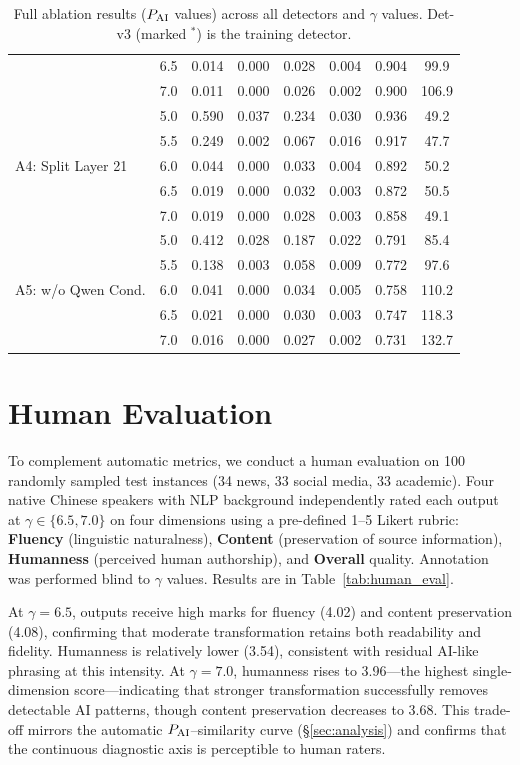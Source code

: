 \begin{table}[t]
\begin{tabular}{l c cccc cc}
& 6.5 & 0.014 & 0.000 & 0.028 & 0.004 & 0.904 & 99.9 \\
& 7.0 & 0.011 & 0.000 & 0.026 & 0.002 & 0.900 & 106.9 \\
\midrule
\multirow{5}{*}{A4: Split Layer 21}
& 5.0 & 0.590 & 0.037 & 0.234 & 0.030 & 0.936 & 49.2 \\
& 5.5 & 0.249 & 0.002 & 0.067 & 0.016 & 0.917 & 47.7 \\
& 6.0 & 0.044 & 0.000 & 0.033 & 0.004 & 0.892 & 50.2 \\
& 6.5 & 0.019 & 0.000 & 0.032 & 0.003 & 0.872 & 50.5 \\
& 7.0 & 0.019 & 0.000 & 0.028 & 0.003 & 0.858 & 49.1 \\
\midrule
\multirow{5}{*}{A5: w/o Qwen Cond.}
& 5.0 & 0.412 & 0.028 & 0.187 & 0.022 & 0.791 & 85.4 \\
& 5.5 & 0.138 & 0.003 & 0.058 & 0.009 & 0.772 & 97.6 \\
& 6.0 & 0.041 & 0.000 & 0.034 & 0.005 & 0.758 & 110.2 \\
& 6.5 & 0.021 & 0.000 & 0.030 & 0.003 & 0.747 & 118.3 \\
& 7.0 & 0.016 & 0.000 & 0.027 & 0.002 & 0.731 & 132.7 \\
\bottomrule
\end{tabular}
\caption{Full ablation results ($P_{\text{AI}}$ values) across all detectors and $\gamma$ values. Det-v3 (marked $^*$) is the training detector.}
\label{tab:ablation_full}
\end{table}

\section{Human Evaluation}
\label{sec:app_human_eval}

To complement automatic metrics, we conduct a human evaluation on 100 randomly sampled test instances (34 news, 33 social media, 33 academic).
Four native Chinese speakers with NLP background independently rated each \styleshield{} output at $\gamma\!\in\!\{6.5, 7.0\}$ on four dimensions using a pre-defined 1--5 Likert rubric:
\textbf{Fluency} (linguistic naturalness),
\textbf{Content} (preservation of source information),
\textbf{Humanness} (perceived human authorship), and
\textbf{Overall} quality.
Annotation was performed blind to $\gamma$ values.
Results are in Table~\ref{tab:human_eval}.

At $\gamma{=}6.5$, outputs receive high marks for fluency (4.02) and content preservation (4.08), confirming that moderate transformation retains both readability and fidelity.
Humanness is relatively lower (3.54), consistent with residual AI-like phrasing at this intensity.
At $\gamma{=}7.0$, humanness rises to 3.96---the highest single-dimension score---indicating that stronger transformation successfully removes detectable AI patterns, though content preservation decreases to 3.68.
This trade-off mirrors the automatic $P_{\text{AI}}$--similarity curve (\S\ref{sec:analysis}) and confirms that the continuous diagnostic axis is perceptible to human raters.

